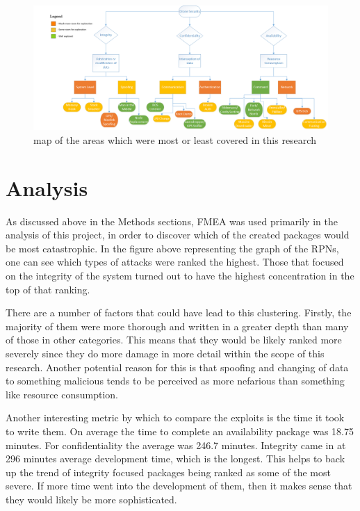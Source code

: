 \documentclass[IEEEtran,letterpaper,10pt,notitlepage,draftclsnofoot]{article}
\begin{document}
\begin{figure}[H]
    \centering
    \includegraphics[width=\textwidth]{color_model}
    \caption{map of the areas which were most or least covered in this research}
\end{figure}

\section{Analysis}
As discussed above in the Methods sections, FMEA was used primarily in the analysis of this project, in order to discover which of the created packages would be most catastrophic. 
In the figure above representing the graph of the RPNs, one can see which types of attacks were ranked the highest. 
Those that focused on the integrity of the system turned out to have the highest concentration in the top of that ranking.

There are a number of factors that could have lead to this clustering.
Firstly, the majority of them were more thorough and written in a greater depth than many of those in other categories.
This means that they would be likely ranked more severely since they do more damage in more detail within the scope of this research.
Another potential reason for this is that spoofing and changing of data to something malicious tends to be perceived as more nefarious than something like resource consumption.

Another interesting metric by which to compare the exploits is the time it took to write them.
On average the time to complete an availability package was 18.75 minutes.
For confidentiality the average was 246.7 minutes.
Integrity came in at 296 minutes average development time, which is the longest.
This helps to back up the trend of integrity focused packages being ranked as some of the most severe.
If more time went into the development of them, then it makes sense that they would likely be more sophisticated.
\end{document}
